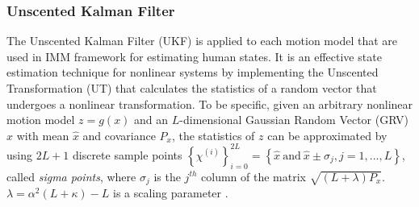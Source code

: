 \documentclass[journal]{IEEEtran}
\begin{document}
	\subsubsection{Unscented Kalman Filter}\label{subsec:UKF}
	The Unscented Kalman Filter (UKF) is applied to each motion model that are used in IMM framework for estimating human states. 
	It is an effective state estimation technique for nonlinear systems by implementing the Unscented Transformation (UT) that calculates the statistics of a random vector that undergoes a nonlinear transformation\cite {haykin2004kalman}.
	To be specific, given an arbitrary nonlinear motion model $z=g(x)$ and an $L$-dimensional Gaussian Random Vector (GRV) $x$ with mean $\hat{x}$ and covariance $P_x$, the statistics of $z$ can be approximated by using $2L+1$ discrete sample points $\left\{\chi^{(i)} \right\}_{i=0}^{2L}=\left\{ \hat{x}\ \text{and}\  \hat{x} \pm \sigma_j, j=1,...,L\right \}$, called \textit{sigma points}, where $\sigma_j$ is the $j^{th}$ column of the matrix $\sqrt{(L+\lambda)P_x}$. $\lambda=\alpha^2(L+\kappa)-L$ is a scaling parameter \cite{hong2013vehicle}.
	
\end{document}
